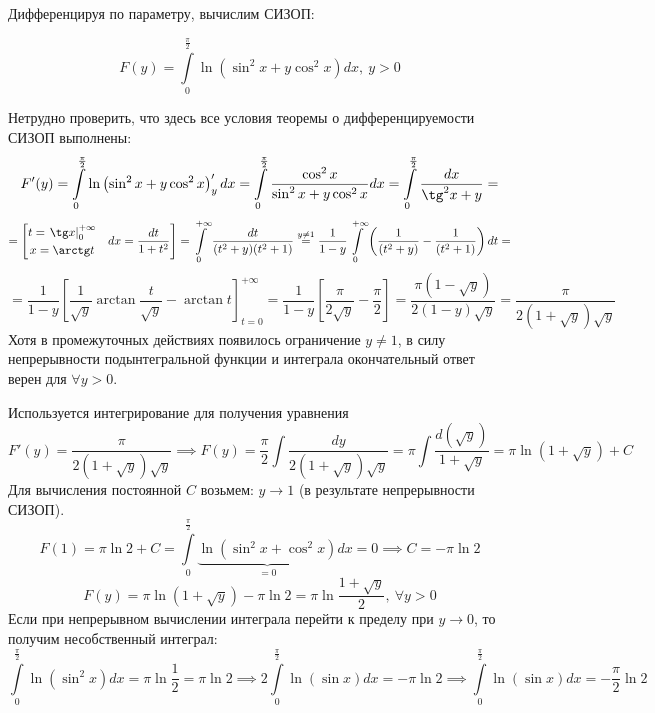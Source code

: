 \documentclass[../../main.tex]{subfiles}
\begin{document}
\begin{example}
    Дифференцируя по параметру, вычислим СИЗОП:

    \[F(y) = \int\limits_0^{\frac{\pi}{2}} \ln
    \left( \sin^2 x + y \cos^2 x \right) dx, \ y > 0\]

    Нетрудно проверить, что здесь все условия теоремы о дифференцируемости 
    СИЗОП
    выполнены:
    \[ F'(y) = \int\limits_0^{\frac{\pi}{2}} \ln
    \left( \sin^2 x + y \cos^2 x \right)'_y dx = 
    \int\limits_0^{\frac{\pi}{2}} \dfrac{\cos^2 x}{\sin^2 x + y \cos^2 x} dx =
    \int\limits_0^{\frac{\pi}{2}} \dfrac{dx}{\tg^2 x  + y} = \]
    \[ = \left[
    \begin{gathered}
        t = \left. \tg x \right|_0^{+\infty} \\
        x = \arctan t
    \end{gathered} \ \ \
    dx = \dfrac{dt}{1 + t^2}
    \right] = \int\limits_0^{+\infty} \dfrac{dt}{(t^2 + y)(t^2 + 1)}
    \overset{y \neq 1}{=}
    \dfrac{1}{1-y} \int\limits_0^{+\infty} \left( \dfrac{1}{(t^2 + y)} -
    \dfrac{1}{(t^2 + 1)} \right) dt = \]
    \[ = \dfrac{1}{1 - y} \left[ \dfrac{1}{\sqrt{y}} \arctan 
    \dfrac{t}{\sqrt{y}}
    - \arctan t \right]_{t = 0}^{+\infty} = \dfrac{1}{1 - y}
    \left[ \dfrac{\pi}{2 \sqrt{y}}
    - \dfrac{\pi}{2} \right] = \dfrac{\pi (1 - \sqrt{y})}{2 (1 - y) \sqrt{y}} =
    \dfrac{\pi}{2 (1 + \sqrt{y}) \sqrt{y}} \]
    Хотя в промежуточных действиях появилось ограничение $y \neq 1$,
    в силу непрерывности
    подынтегральной функции и интеграла окончательный ответ верен для
    $\forall y > 0$.

    Используется интегрирование для получения уравнения
    \[F'(y) = \dfrac{\pi}{2(1+\sqrt{y})\sqrt{y}} \implies F(y) =
    \dfrac{\pi}{2} \int \dfrac{dy}{2 (1 + \sqrt{y}) \sqrt{y}}  = \pi
    \int \dfrac{d(\sqrt{y})}{1 + \sqrt{y}} = \pi \ln (1 + \sqrt{y}) + C \]
    Для вычисления постоянной $C$ возьмем: $y \to 1$ (в результате
    непрерывности СИЗОП).
    \[F(1) = \pi \ln 2 + C = \int\limits_0^{\frac{\pi}{2}}
    \underbrace{ \ln \left( \sin^2 x + \cos^2 x \right)}_{= 0} dx = 0
    \implies C = -\pi \ln 2\]
    \[F(y) = \pi \ln(1 + \sqrt{y}) - \pi \ln 2 =
    \pi \ln \dfrac{1 + \sqrt{y}}{2}, \ \forall y > 0\]
    Если при непрерывном вычислении интеграла перейти к пределу при $y \to 0$,
    то получим несобственный интеграл:
    \[ \int\limits_0^{\frac{\pi}{2}} \ln (\sin^2 x)dx = \pi \ln \dfrac{1}{2} =
    \pi \ln 2 \implies 2 \int\limits_0^{\frac{\pi}{2}} \ln (\sin x) dx = 
    - \pi \ln 2 \implies \int\limits_0^{\frac{\pi}{2}} \ln (\sin x) dx = 
    - \dfrac{\pi}{2}\ln 2\]
    
\end{example}
\end{document}

